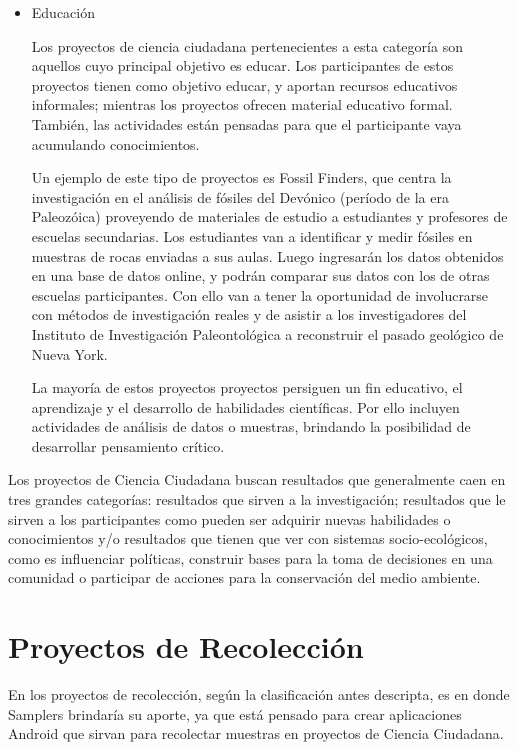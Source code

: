 \begin{itemize}
	\item {Educación} 
	
	Los proyectos de ciencia ciudadana pertenecientes a esta categoría son aquellos cuyo principal objetivo es educar. Los participantes de estos proyectos tienen como objetivo educar, y aportan recursos educativos informales; mientras los proyectos ofrecen material educativo formal. También, las actividades están pensadas para que el participante vaya acumulando conocimientos.
	
	Un ejemplo de este tipo de proyectos es Fossil Finders, que centra la investigación en el análisis de fósiles del Devónico (período de la era Paleozóica) proveyendo de materiales de estudio a estudiantes y profesores de escuelas secundarias. Los estudiantes van a identificar y medir fósiles en muestras de rocas enviadas a sus aulas. Luego ingresarán los datos obtenidos en una base de datos online, y podrán comparar sus datos con los de otras escuelas participantes. Con ello van a tener la oportunidad de involucrarse con métodos de investigación reales y de asistir a los investigadores del Instituto de Investigación Paleontológica a reconstruir el pasado geológico de Nueva York. \cite{FossilFinders}

	La mayoría de estos proyectos proyectos persiguen un fin educativo, el aprendizaje y el desarrollo de habilidades científicas. Por ello incluyen actividades de análisis de datos o muestras, brindando la posibilidad de desarrollar pensamiento crítico. 
	\end{itemize} 
	
	Los proyectos de Ciencia Ciudadana buscan resultados que generalmente caen en tres grandes categorías: resultados que sirven a la investigación; resultados que le sirven a los participantes como pueden ser adquirir nuevas habilidades o conocimientos y/o resultados que tienen que ver con sistemas socio-ecológicos, como es influenciar políticas, construir bases para la toma de decisiones en una comunidad o participar de acciones para la conservación del medio ambiente. \cite{shirk2012public}

\section{Proyectos de Recolección}	 
	En los proyectos de recolección, según la clasificación antes descripta, es en donde Samplers  brindaría su aporte, ya que está pensado para crear aplicaciones Android que sirvan para recolectar muestras en proyectos de Ciencia Ciudadana.
	
